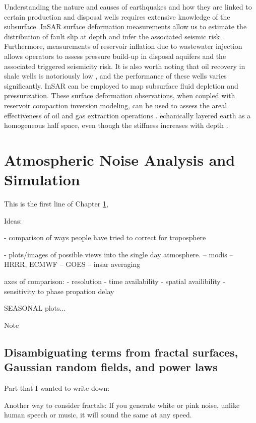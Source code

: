 \documentclass{utexasthesis}
\begin{document}
Understanding the nature and causes of earthquakes and how they are linked to certain production and disposal wells requires extensive knowledge of the subsurface. InSAR surface deformation measurements allow us to estimate the distribution of fault slip at depth and infer the associated seismic risk \cite{Segall2010, huang2017fault}. Furthermore, measurements of reservoir inflation due to wastewater injection allows operators to assess pressure build-up in disposal aquifers and the associated triggered seismicity risk. It is also worth noting that oil recovery in shale wells is notoriously low \cite{clark2009determination}, and the performance of these wells varies significantly. InSAR can be employed to map subsurface fluid depletion and pressurization. These surface deformation observations, when coupled with reservoir compaction inversion modeling, can be used to assess the areal effectiveness of oil and gas extraction operations \cite{Du2001, Vasco2005}. 
echanically layered earth as a homogeneous half space, even though the stiffness increases with depth \cite{Du1992}. 


\chapter{Atmospheric Noise Analysis and Simulation}
\label{chap:atmo-noise}

This is the first line of Chapter \ref{chap:atmo-noise}, 


Ideas:

- comparison of ways people have tried to correct for troposphere

- plots/images of possible views into the single day atmosphere.
 -- modis
 -- HRRR, ECMWF
 --  GOES
 -- insar averaging
 
 axes of comparison:
 - resolution
 - time availability
 - spatial availibility
 - sensitivity to phase propation delay
 
 
 SEASONAL plots...
 
 Note

\section{Disambiguating terms from fractal surfaces, Gaussian random
fields, and power
laws}
\label{disambiguating-terms-from-fractal-surfaces-gaussian-random-fields-and-power-laws}

Part that I wanted to write down:

Another way to consider fractals: If you generate white or pink noise, unlike human speech or music, it will sound the same at any speed.
\end{document}
